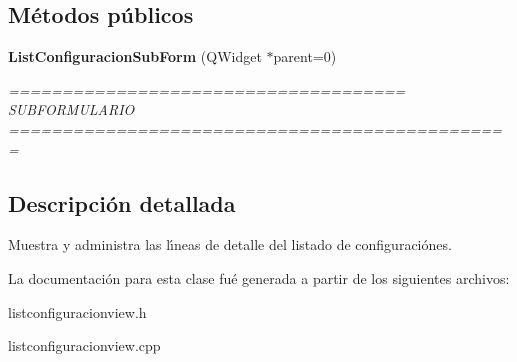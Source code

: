 \subsection*{M\'{e}todos p\'{u}blicos}
\begin{CompactItemize}
\item 
{\bf List\-Configuracion\-Sub\-Form} (QWidget $\ast$parent=0)\label{classListConfiguracionSubForm_a0}

\begin{CompactList}\small\item\em ===================================== SUBFORMULARIO =============================================== \item\end{CompactList}\end{CompactItemize}


\subsection{Descripci\'{o}n detallada}
Muestra y administra las l\'{\i}neas de detalle del listado de configuraci\'{o}nes. 



La documentaci\'{o}n para esta clase fu\'{e} generada a partir de los siguientes archivos:\begin{CompactItemize}
\item 
listconfiguracionview.h\item 
listconfiguracionview.cpp\end{CompactItemize}
